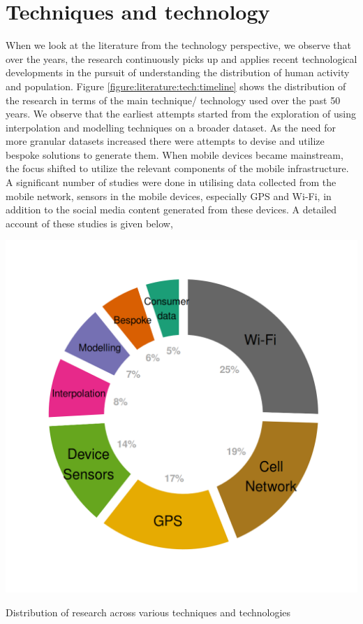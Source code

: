 \section{Techniques and technology}\label{section:literature:technology}

When we look at the literature from the technology perspective, we observe that over the years, the research continuously picks up and applies recent technological developments in the pursuit of understanding the distribution of human activity and population.
Figure \ref{figure:literature:tech:timeline} shows the distribution of the research in terms of the main technique/ technology used over the past 50 years.
We observe that the earliest attempts started from the exploration of using interpolation and modelling techniques on a broader dataset.
As the need for more granular datasets increased there were attempts to devise and utilize bespoke solutions to generate them.
When mobile devices became mainstream, the focus shifted to utilize the relevant components of the mobile infrastructure.
A significant number of studies were done in utilising data collected from the mobile network, sensors in the mobile devices, especially GPS and Wi-Fi, in addition to the social media content generated from these devices.
A detailed account of these studies is given below,

\begin{marginfigure}[1cm]
  \includegraphics[trim={1.1cm 1cm 1cm 1cm},clip]{images/literature-technology.png}
  \caption{Distribution of research across various techniques and technologies}
  \label{figure:literature:timeline}
\end{marginfigure}

